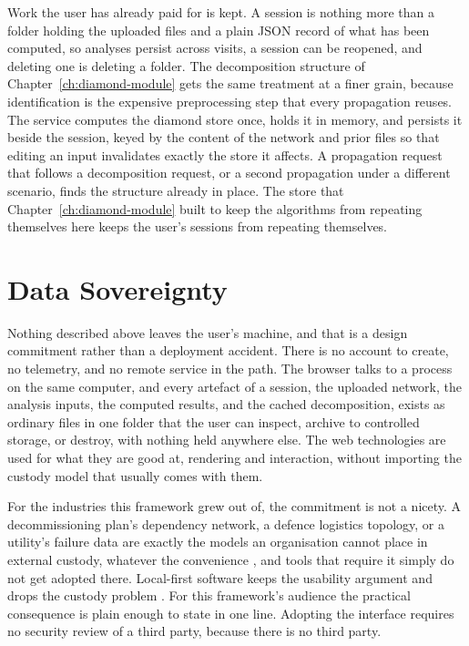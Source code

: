 \documentclass[12pt]{report}
\begin{document}
Work the user has already paid for is kept. A session is nothing more than a folder holding the uploaded files and a plain JSON record of what has been computed, so analyses persist across visits, a session can be reopened, and deleting one is deleting a folder. The decomposition structure of Chapter~\ref{ch:diamond-module} gets the same treatment at a finer grain, because identification is the expensive preprocessing step that every propagation reuses. The service computes the diamond store once, holds it in memory, and persists it beside the session, keyed by the content of the network and prior files so that editing an input invalidates exactly the store it affects. A propagation request that follows a decomposition request, or a second propagation under a different scenario, finds the structure already in place. The store that Chapter~\ref{ch:diamond-module} built to keep the algorithms from repeating themselves here keeps the user's sessions from repeating themselves.

\section{Data Sovereignty}
\label{sec:fe-sovereignty}

Nothing described above leaves the user's machine, and that is a design commitment rather than a deployment accident. There is no account to create, no telemetry, and no remote service in the path. The browser talks to a process on the same computer, and every artefact of a session, the uploaded network, the analysis inputs, the computed results, and the cached decomposition, exists as ordinary files in one folder that the user can inspect, archive to controlled storage, or destroy, with nothing held anywhere else. The web technologies are used for what they are good at, rendering and interaction, without importing the custody model that usually comes with them.

For the industries this framework grew out of, the commitment is not a nicety. A decommissioning plan's dependency network, a defence logistics topology, or a utility's failure data are exactly the models an organisation cannot place in external custody, whatever the convenience \cite{hashizume2013analysis}, and tools that require it simply do not get adopted there. Local-first software keeps the usability argument and drops the custody problem \cite{kleppmann2019local}. For this framework's audience the practical consequence is plain enough to state in one line. Adopting the interface requires no security review of a third party, because there is no third party.
\end{document}
